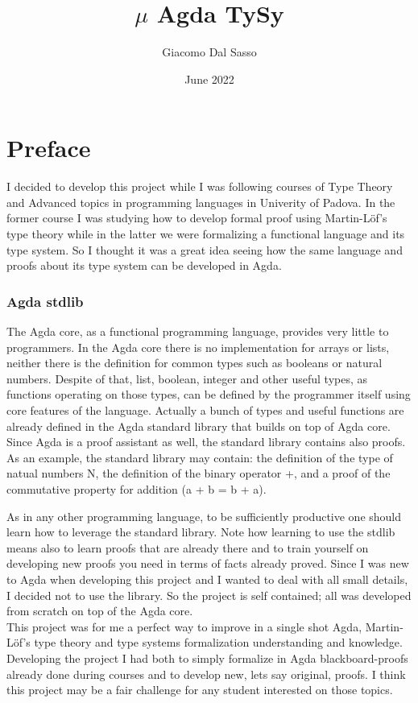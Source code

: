 \documentclass{article}
\title{$\mu$ Agda TySy}
\author{Giacomo Dal Sasso}
\date{June 2022}
\begin{document}
\maketitle


\section{Preface}

I decided to develop this project while I was following courses of Type Theory and Advanced topics in programming languages in Univerity of Padova.
In the former course I was studying how to develop formal proof using Martin-Löf's type theory while in the latter we were formalizing a functional language and its type system.
So I thought it was a great idea seeing how the same language and proofs about its type system can be developed in Agda.


\subsubsection*{Agda stdlib}
The Agda core, as a functional programming language, provides very little to programmers.
In the Agda core there is no implementation for arrays or lists, neither there is the definition for common types such as booleans or natural numbers.
Despite of that, list, boolean, integer and other useful types, as functions operating on those types, can be defined by the programmer itself using core features of the language.
Actually a bunch of types and useful functions are already defined in the Agda standard library that builds on top of Agda core.
Since Agda is a proof assistant as well, the standard library contains also proofs.
As an example, the standard library may contain: the definition of the type of natual numbers N, the definition of the binary operator +, and a proof of the commutative property for addition (a + b = b + a).

As in any other programming language, to be sufficiently productive one should learn how to leverage the standard library.
Note how learning to use the stdlib means also to learn proofs that are already there and to train yourself on developing new proofs you need in terms of facts already proved.
Since I was new to Agda when developing this project and I wanted to deal with all small details, I decided not to use the library.
So the project is self contained; all was developed from scratch on top of the Agda core.\\

This project was for me a perfect way to improve in a single shot Agda, Martin-Löf's type theory and type systems formalization understanding and knowledge.
Developing the project I had both to simply formalize in Agda blackboard-proofs already done during courses and to develop new, lets say original, proofs.
I think this project may be a fair challenge for any student interested on those topics.
\end{document}
